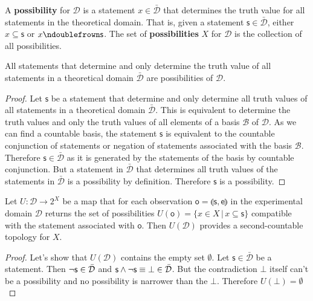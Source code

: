 \documentclass[11pt,letterpaper,fleqn]{memoir} %
\begin{document}
\begin{mathSection}
\begin{defn}
	A \textbf{possibility} for $\mathcal{D}$ is a statement $x \in \bar{\mathcal{D}}$ that determines the truth value for all statements in the theoretical domain. That is, given a statement $\mathsf{s} \in \bar{\mathcal{D}}$, either $x \subseteq \mathsf{s}$ or $x \ncomp \mathsf{s}$. The set of \textbf{possibilities} $X$ for $\mathcal{D}$ is the collection of all possibilities.
\end{defn}

\begin{prop}
	All statements that determine and only determine the truth value of all statements in a theoretical domain $\bar{\mathcal{D}}$ are possibilities of $\mathcal{D}$.
\end{prop}

\begin{proof}
	Let $\mathsf{s}$ be a statement that determine and only determine all truth values of all statements in a theoretical domain $\bar{\mathcal{D}}$. This is equivalent to determine the truth values and only the truth values of all elements of a basis $\mathcal{B}$ of $\mathcal{D}$. As we can find a countable basis, the statement $\mathsf{s}$ is equivalent to the countable conjunction of statements or negation of statements associated with the basis $\mathcal{B}$. Therefore $\mathsf{s} \in \bar{\mathcal{D}}$ as it is generated by the statements of the basis by countable conjunction. But a statement in $\bar{\mathcal{D}}$ that determines all truth values of the statements in $\bar{\mathcal{D}}$ is a possibility by definition. Therefore $\mathsf{s}$ is a possibility.
\end{proof}

\begin{prop}
	Let $U : \mathcal{D} \rightarrow 2^X$ be a map that for each observation $\mathsf{o} = \llparenthesis \mathsf{s}, \mathsf{e} \rrparenthesis$ in the experimental domain $\mathcal{D}$ returns the set of possibilities $U(\mathsf{o}) = \{ x \in X \, | \, x \subseteq \mathsf{s}\}$ compatible with the statement associated with $\mathsf{o}$. Then $U(\mathcal{D})$ provides a second-countable topology for $X$.
\end{prop}

\begin{proof}
	Let's show that $U(\mathcal{D})$ contains the empty set $\emptyset$. Let $\mathsf{s} \in \bar{\mathcal{D}}$ be a statement. Then $\neg\mathsf{s} \in \bar{\mathcal{D}}$ and $\mathsf{s} \wedge \neg\mathsf{s} \equiv \bot \in \bar{\mathcal{D}}$. But the contradiction $\bot$ itself can't be a possibility and no possibility is narrower than the $\bot$. Therefore $U(\bot) = \emptyset$
\end{proof}


\end{mathSection}
\end{document}
